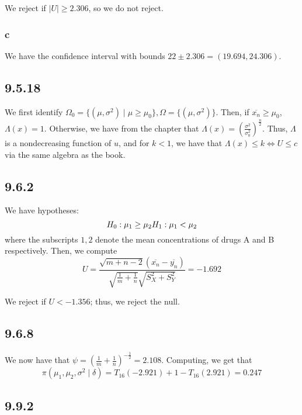 \documentclass[12pt,letterpaper]{article}
\theoremstyle{definition}
\begin{document}
We reject if $|U| \geq 2.306$, so we do not reject.

\subsubsection*{c}

We have the confidence interval with bounds $22 \pm 2.306 = (19.694, 24.306)$.

\subsection*{9.5.18}

We first identify $\Omega_0 = \{(\mu, \sigma^2) \mid \mu \geq \mu_0\}, \Omega =
\{(\mu, \sigma^2)\}$. Then, if $\overline{x_n} \geq \mu_0$, $\Lambda(x) = 1$.
Otherwise, we have from the chapter that $\Lambda(x) = \left(
  \frac{\sigma^2}{\sigma_0^2} \right)^{\frac{n}{2}}$. Thus, $\Lambda$ is a
nondecreasing function of $u$, and for $k < 1$, we have that $\Lambda(x) \leq k \iff U
\leq c$ via the same algebra as the book.

\subsection*{9.6.2}

We have hypotheses:
\[
  H_0: \mu_1 \geq \mu_2 \\
  H_1: \mu_1 < \mu_2
\]
where the subscripts $1,2$ denote the mean concentrations of drugs A and B
respectively. Then, we compute
\[
  U = \frac{\sqrt{m+n-2}(\overline{x_n} - \overline{y_n})}{\sqrt{\frac{1}{m} +
      \frac{1}{n}}\sqrt{S_X^2 +  S_Y^2}} = -1.692
\]

We reject if $U < -1.356$; thus, we reject the null.

\subsection*{9.6.8}

We now have that $\psi = \left( \frac{1}{m} + \frac{1}{n} \right)^{-\frac{1}{2}}
= 2.108$. Computing, we get that
\[
  \pi(\mu_1, \mu_2, \sigma^2 \mid \delta) = T_{16}(-2.921) + 1 - T_{16}(2.921) = 0.247
\]

\subsection*{9.9.2}

\end{document}
